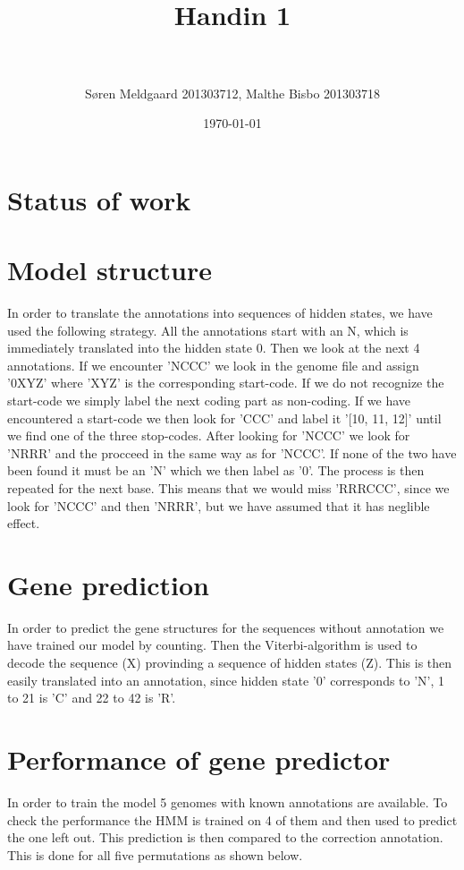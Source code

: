 \documentclass[paper=a4, fontsize=11pt]{scrartcl} %
\title{	
\normalfont \normalsize 
\horrule{0.5pt} \\[0.4cm] %
\huge Handin 1 \\ %
\horrule{2pt} \\[0.5cm] %
}
\author{S\o ren Meldgaard 201303712, Malthe Bisbo 201303718} %
\date{\normalsize\today} %
\numberwithin{equation}{section} %
\numberwithin{figure}{section} %
\numberwithin{table}{section} %
\begin{document}
\maketitle %

\section{Status of work}

\section{Model structure}

In order to translate the annotations into sequences of hidden states, we have used the following strategy.
All the annotations start with an N, which is immediately translated into the hidden state 0. Then we look at the next 4 annotations. If we encounter 'NCCC' we look in the genome file and assign '0XYZ' where 'XYZ' is the corresponding start-code. If we do not recognize the start-code we simply label the next coding part as non-coding. If we have encountered a start-code we then look for 'CCC' and label it '[10, 11, 12]' until we find one of the three stop-codes. After looking for 'NCCC' we look for 'NRRR' and the procceed in the same way as for 'NCCC'. If none of the two have been found it must be an 'N' which we then label as '0'. The process is then repeated for the next base. This means that we would miss 'RRRCCC', since we look for 'NCCC' and then 'NRRR', but we have assumed that it has neglible effect.

\section{Gene prediction}
In order to predict the gene structures for the sequences without annotation we have trained our model by counting. Then the Viterbi-algorithm is used to decode the sequence (X) provinding a sequence of hidden states (Z). This is then easily translated into an annotation, since hidden state '0' corresponds to 'N', 1 to 21 is 'C' and 22 to 42 is 'R'.

\section{Performance of gene predictor}
In order to train the model 5 genomes with known annotations are available. To check the performance the HMM is trained on 4 of them and then used to predict the one left out. This prediction is then compared to the correction annotation. This is done for all five permutations as shown below.
\end{document}
